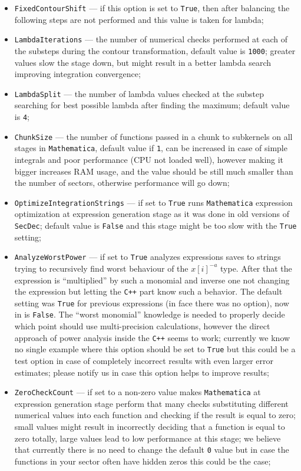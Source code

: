 \documentclass[preprint,12pt]{elsarticle}
\begin{document}
\begin{itemize}
 \item {\tt FixedContourShift} --- if this option is set to {\tt True}, then after balancing the following steps are not performed and this value is taken for lambda;
 \item {\tt LambdaIterations} --- the number of numerical checks performed at each of the substeps during the contour transformation, default value is {\tt 1000}; greater values slow the stage down, but might result in a better lambda search improving integration convergence;
 \item {\tt LambdaSplit} --- the number of lambda values checked at the substep searching for best possible lambda after finding the maximum; default value is {\tt 4};
 \item {\tt ChunkSize} --- the number of functions passed in a chunk to subkernels on all stages in {\tt Mathematica}, default value if {\tt 1}, can be increased in case of simple integrals and poor performance (CPU not loaded well), however making it bigger increases RAM usage, and the value should be still much smaller than the number of sectors, otherwise performance will go down;
 \item {\tt OptimizeIntegrationStrings} --- if set to {\tt True} runs {\tt Mathematica} expression optimization at expression generation stage as it was done in old versions of {\tt SecDec}; default value is {\tt False} and this stage might be too slow with the {\tt True} setting;
 \item {\tt AnalyzeWorstPower} --- if set to {\tt True} analyzes expressions saves to strings trying to recursively find worst behaviour of the $x[i]^{-a}$ type. After that the expression is ``multiplied'' by such a monomial and inverse one not changing the expression but letting the {\tt C++} part know such a behavior. The default setting was {\tt True} for previous expressions (in face there was no option), now in is {\tt False}. The ``worst monomial'' knowledge is needed to properly decide which point should use multi-precision calculations, however the direct approach of power analysis inside the {\tt C++} seems to work; currently we know no single example where this option should be set to {\tt True} but this could be a test option in case of completely incorrect results with even larger error estimates; please notify us in case this option helps to improve results;
 \item {\tt ZeroCheckCount} --- if set to a non-zero value makes {\tt Mathematica} at expression generation stage perform that many checks substituting different numerical values into each function and checking if the result is equal to zero; small values might result in incorrectly deciding that a function is equal to zero totally, large values lead to low performance at this stage; we believe that currently there is no need to change the default {\tt 0} value but in case the functions in your sector often have hidden zeros this could be the case;

\end{itemize}
\end{document}
